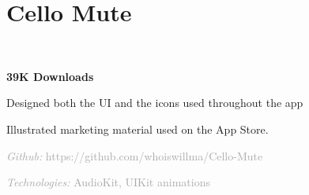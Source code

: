 \documentclass[]{deedy-resume-openfont}
\let\sectionold\section
\renewcommand{\section}[1]{
	\sectionold{\textcolor{sectiontitlecolor}{#1}}
}
\begin{document}
\begin{minipage}[t]{0.66\textwidth}
\section{Cello Mute}
 \\

\begin{tightemize}
\item \textbf{39K Downloads}
\item Designed both the UI and the icons used throughout the app
\item Illustrated marketing material used on the App Store.
\\
\item \textcolor{darkgray}{\textit{Github:} https://github.com/whoiswillma/Cello-Mute}
\item \textcolor{darkgray}{\textit{Technologies:} AudioKit, UIKit animations}
\end{tightemize}

\iffalse
\runsubsection{Liloc}
\descript{Life by Location}
\location{Summer 2019 | Independent iOS App}
\begin{tightemize}
\item Extensive use of Core Data and related technologies
\item Use of custom view controller transitions and animations, both interactive and non-interactive.
\item Exploration of location-based APIs.
\\
\item \textcolor{darkgray}{\textit{Github: https://github.com/whoiswillma/Liloc}}
\item \textcolor{darkgray}{\textit{Technologies: \textbf{Core Data}, \textbf{Core Location}, NSFetchedResultsController, Swift 5 }}
\end{tightemize} 
\sectionsep
\fi

\iffalse
\section{Course Scheduler}
\descript{Plan a Cornell Semester}
\descript{Spring 2019 | CS 3110 Project}
\begin{tightemize}
\item Arranges a schedule from chosen courses
\item Uses data from Cornell's API to schedule courses
\item Select between a distributed or condensed schedule
\\
\item \textcolor{darkgray}{\textit{Github: https://github.com/whoiswillma/cs3110-s2019-scheduler}}
\end{tightemize}
\sectionsep
\fi


\end{minipage}
\end{document}
